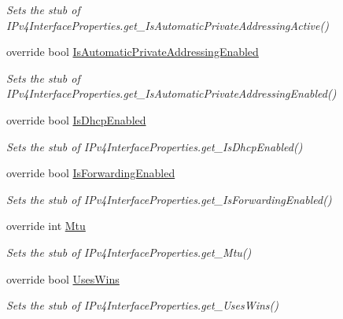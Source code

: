 \begin{DoxyCompactItemize}
\begin{DoxyCompactList}\small\item\em Sets the stub of I\-Pv4\-Interface\-Properties.\-get\-\_\-\-Is\-Automatic\-Private\-Addressing\-Active()\end{DoxyCompactList}\item 
override bool \hyperlink{class_system_1_1_net_1_1_network_information_1_1_fakes_1_1_stub_i_pv4_interface_properties_a72c6bb9ae55e9763d965979cafbb8561}{Is\-Automatic\-Private\-Addressing\-Enabled}
\begin{DoxyCompactList}\small\item\em Sets the stub of I\-Pv4\-Interface\-Properties.\-get\-\_\-\-Is\-Automatic\-Private\-Addressing\-Enabled()\end{DoxyCompactList}\item 
override bool \hyperlink{class_system_1_1_net_1_1_network_information_1_1_fakes_1_1_stub_i_pv4_interface_properties_ae71c5352ccb87ed37c77ef10f764169c}{Is\-Dhcp\-Enabled}
\begin{DoxyCompactList}\small\item\em Sets the stub of I\-Pv4\-Interface\-Properties.\-get\-\_\-\-Is\-Dhcp\-Enabled()\end{DoxyCompactList}\item 
override bool \hyperlink{class_system_1_1_net_1_1_network_information_1_1_fakes_1_1_stub_i_pv4_interface_properties_a2d2e3d8c5efdf4d6df6367e12182b12f}{Is\-Forwarding\-Enabled}
\begin{DoxyCompactList}\small\item\em Sets the stub of I\-Pv4\-Interface\-Properties.\-get\-\_\-\-Is\-Forwarding\-Enabled()\end{DoxyCompactList}\item 
override int \hyperlink{class_system_1_1_net_1_1_network_information_1_1_fakes_1_1_stub_i_pv4_interface_properties_a459ba3946fe245f6b55eeb044c79dab8}{Mtu}
\begin{DoxyCompactList}\small\item\em Sets the stub of I\-Pv4\-Interface\-Properties.\-get\-\_\-\-Mtu()\end{DoxyCompactList}\item 
override bool \hyperlink{class_system_1_1_net_1_1_network_information_1_1_fakes_1_1_stub_i_pv4_interface_properties_a1cef44b6b5b6794150960c6e50dd2d7a}{Uses\-Wins}
\begin{DoxyCompactList}\small\item\em Sets the stub of I\-Pv4\-Interface\-Properties.\-get\-\_\-\-Uses\-Wins()\end{DoxyCompactList}\end{DoxyCompactItemize}


